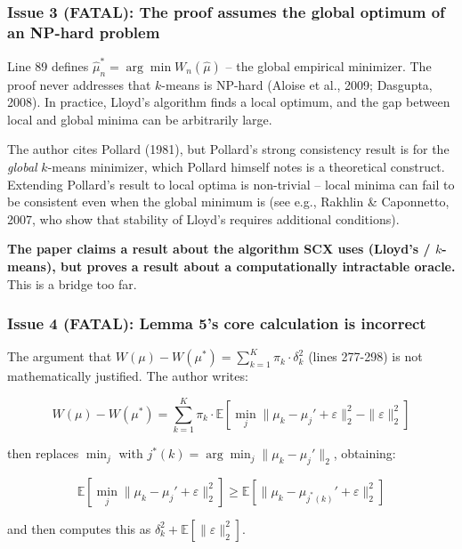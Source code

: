 \documentclass[
  12pt,
]{article}
\begin{document}
\subsubsection{Issue 3 (FATAL): The proof assumes the global optimum of
an NP-hard
problem}\label{issue-3-fatal-the-proof-assumes-the-global-optimum-of-an-np-hard-problem}

Line 89 defines \(\hat{\mu}_n^* = \arg\min W_n(\hat{\mu})\) -- the
global empirical minimizer. The proof never addresses that \(k\)-means
is NP-hard (Aloise et al., 2009; Dasgupta, 2008). In practice, Lloyd's
algorithm finds a local optimum, and the gap between local and global
minima can be arbitrarily large.

The author cites Pollard (1981), but Pollard's strong consistency result
is for the \emph{global} \(k\)-means minimizer, which Pollard himself
notes is a theoretical construct. Extending Pollard's result to local
optima is non-trivial -- local minima can fail to be consistent even
when the global minimum is (see e.g., Rakhlin \& Caponnetto, 2007, who
show that stability of Lloyd's requires additional conditions).

\textbf{The paper claims a result about the algorithm SCX uses (Lloyd's
/ \(k\)-means), but proves a result about a computationally intractable
oracle.} This is a bridge too far.

\subsubsection{Issue 4 (FATAL): Lemma 5's core calculation is
incorrect}\label{issue-4-fatal-lemma-5s-core-calculation-is-incorrect}

The argument that
\(W(\mu) - W(\mu^*) = \sum_{k=1}^K \pi_k \cdot \delta_k^2\) (lines
277-298) is not mathematically justified. The author writes:

\[W(\mu) - W(\mu^*) = \sum_{k=1}^K \pi_k \cdot \mathbb{E}\left[ \min_j \|\mu_k - \mu_j' + \varepsilon\|_2^2 - \|\varepsilon\|_2^2 \right]\]

then replaces \(\min_j\) with
\(j^*(k) = \arg\min_j \|\mu_k - \mu_j'\|_2\), obtaining:

\[\mathbb{E}\left[ \min_j \|\mu_k - \mu_j' + \varepsilon\|_2^2 \right] \geq \mathbb{E}\left[ \|\mu_k - \mu_{j^*(k)}' + \varepsilon\|_2^2 \right]\]

and then computes this as
\(\delta_k^2 + \mathbb{E}[\|\varepsilon\|_2^2]\).
\end{document}
